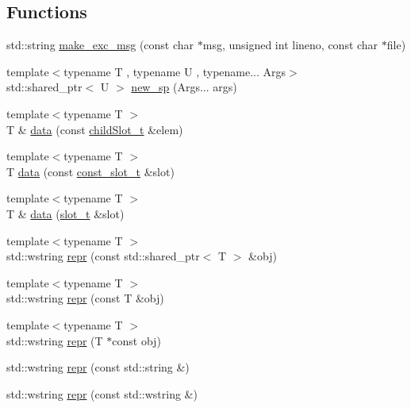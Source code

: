 \subsection*{Functions}
\begin{DoxyCompactItemize}
\item 
std\+::string \mbox{\hyperlink{namespaceebml_a41bf8a299c4418f406beff89817b0690}{make\+\_\+exc\+\_\+msg}} (const char $\ast$msg, unsigned int lineno, const char $\ast$file)
\item 
{\footnotesize template$<$typename T , typename U , typename... Args$>$ }\\std\+::shared\+\_\+ptr$<$ U $>$ \mbox{\hyperlink{namespaceebml_a224edf6a007990902f8ae866e3e2fc59}{new\+\_\+sp}} (Args... args)
\item 
{\footnotesize template$<$typename T $>$ }\\T \& \mbox{\hyperlink{namespaceebml_a6365629b3110a3c5d0cde94d08aac26c}{data}} (const \mbox{\hyperlink{classebml_1_1childSlot__t}{child\+Slot\+\_\+t}} \&elem)
\item 
{\footnotesize template$<$typename T $>$ }\\T \mbox{\hyperlink{namespaceebml_a766ff55857f1018516a926913abc8a83}{data}} (const \mbox{\hyperlink{classebml_1_1const__slot__t}{const\+\_\+slot\+\_\+t}} \&slot)
\item 
{\footnotesize template$<$typename T $>$ }\\T \& \mbox{\hyperlink{namespaceebml_ad2539ebb0462e9038828f80590adf688}{data}} (\mbox{\hyperlink{classebml_1_1slot__t}{slot\+\_\+t}} \&slot)
\item 
{\footnotesize template$<$typename T $>$ }\\std\+::wstring \mbox{\hyperlink{namespaceebml_a5478072bc68f4104a63a83d14785c9d2}{repr}} (const std\+::shared\+\_\+ptr$<$ T $>$ \&obj)
\item 
{\footnotesize template$<$typename T $>$ }\\std\+::wstring \mbox{\hyperlink{namespaceebml_a3c5e99350812f2a7182e2de8f1e46b3b}{repr}} (const T \&obj)
\item 
{\footnotesize template$<$typename T $>$ }\\std\+::wstring \mbox{\hyperlink{namespaceebml_ac8f264e994bf8c22e2a6a9624460ddf9}{repr}} (T $\ast$const obj)
\item 
std\+::wstring \mbox{\hyperlink{namespaceebml_a6021a6dce62f371d7ed989dc29be2599}{repr}} (const std\+::string \&)
\item 
std\+::wstring \mbox{\hyperlink{namespaceebml_a69e4c6909c8a7fc69edd32e99ec8a490}{repr}} (const std\+::wstring \&)

\end{DoxyCompactItemize}
